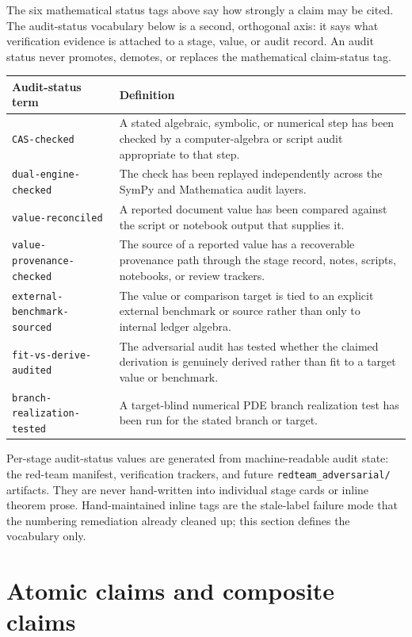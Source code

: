 The six mathematical status tags above say how strongly a claim may be cited.
The audit-status vocabulary below is a second, orthogonal axis: it says what
verification evidence is attached to a stage, value, or audit record.  An audit
status never promotes, demotes, or replaces the mathematical claim-status tag.

\begin{longtable}{L{0.34\textwidth}L{0.57\textwidth}}
\toprule
Audit-status term & Definition \\
\midrule
\endhead
\texttt{CAS-checked} & A stated algebraic, symbolic, or numerical step has
been checked by a computer-algebra or script audit appropriate to that step. \\
\addlinespace
\texttt{dual-engine-checked} & The check has been replayed independently across
the SymPy and Mathematica audit layers. \\
\addlinespace
\texttt{value-reconciled} & A reported document value has been compared against
the script or notebook output that supplies it. \\
\addlinespace
\texttt{value-provenance-checked} & The source of a reported value has a
recoverable provenance path through the stage record, notes, scripts, notebooks,
or review trackers. \\
\addlinespace
\texttt{external-benchmark-sourced} & The value or comparison target is tied to
an explicit external benchmark or source rather than only to internal ledger
algebra. \\
\addlinespace
\texttt{fit-vs-derive-audited} & The adversarial audit has tested whether the
claimed derivation is genuinely derived rather than fit to a target value or
benchmark. \\
\addlinespace
\texttt{branch-realization-tested} & A target-blind numerical PDE branch
realization test has been run for the stated branch or target. \\
\bottomrule
\end{longtable}

Per-stage audit-status values are generated from machine-readable audit state:
the red-team manifest, verification trackers, and future
\texttt{redteam\_adversarial/} artifacts.  They are never hand-written into
individual stage cards or inline theorem prose.  Hand-maintained inline tags
are the stale-label failure mode that the numbering remediation already cleaned
up; this section defines the vocabulary only.

\section{Atomic claims and composite claims}
\label{sec:atomic-composite-claims}

